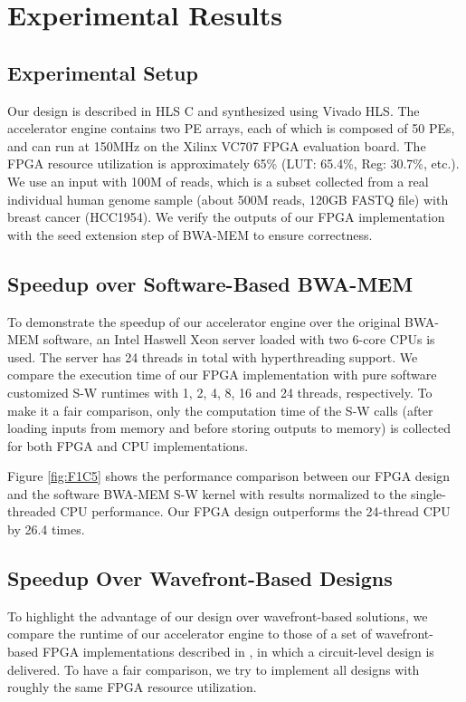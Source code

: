 \section{Experimental Results} 
\label{sec:results}

\subsection{Experimental Setup}

Our design is described in HLS C and synthesized using Vivado HLS.
The accelerator engine contains two PE arrays, each of which is composed of 50 PEs, and can run at 150MHz on the Xilinx VC707 FPGA evaluation board.
The FPGA resource utilization is approximately 65\% (LUT: 65.4\%, Reg: 30.7\%, etc.). 
We use an input with 100M of reads, which is a subset collected from a real individual human genome sample (about 500M reads, 120GB FASTQ file) with breast cancer (HCC1954). 
We verify the outputs of our FPGA implementation with the seed extension step of BWA-MEM to ensure correctness. 

\subsection{Speedup over Software-Based BWA-MEM}

To demonstrate the speedup of our accelerator engine over the original BWA-MEM software, 
an Intel Haswell Xeon server loaded with two 6-core CPUs is used.
The server has 24 threads in total with hyperthreading support.
We compare the execution time of our FPGA implementation with pure software customized S-W runtimes with 1, 2, 4, 8, 16 and 24 threads, respectively.
To make it a fair comparison, only the computation time of the S-W calls (after loading inputs from memory and before storing outputs to memory) is collected for both FPGA and CPU implementations.

Figure \ref{fig:F1C5} shows the performance comparison between our FPGA design and the software BWA-MEM S-W kernel with results normalized to the single-threaded CPU performance.
Our FPGA design outperforms the 24-thread CPU by 26.4 times.

\subsection{Speedup Over Wavefront-Based Designs}

To highlight the advantage of our design over wavefront-based solutions, 
we compare the runtime of our accelerator engine to those of a set of wavefront-based FPGA implementations described in \cite{Zhang2007}, in which a circuit-level design is delivered. To have a fair comparison, we try to implement all designs with roughly the same FPGA resource utilization.

